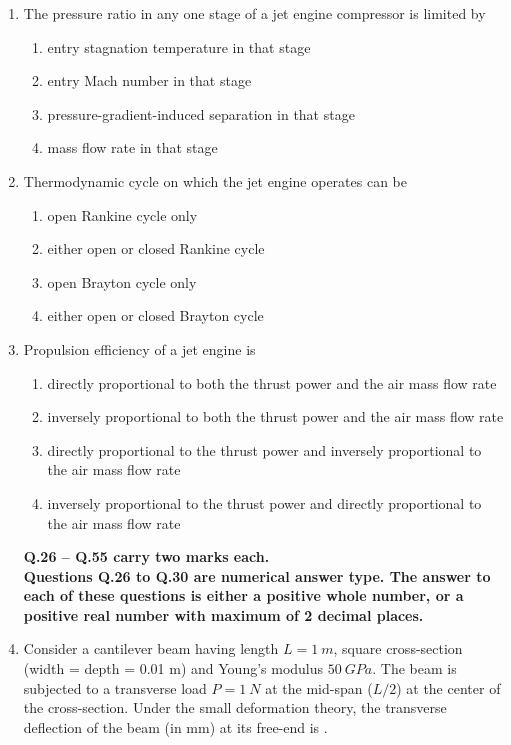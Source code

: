\documentclass{article}
\begin{document}
\begin{enumerate}
\item The pressure ratio in any one stage of a jet engine compressor is limited by
\begin{enumerate}
\item entry stagnation temperature in that stage
\item entry Mach number in that stage
\item pressure-gradient-induced separation in that stage
\item mass flow rate in that stage
\end{enumerate}

\item Thermodynamic cycle on which the jet engine operates can be
\begin{multicols}{2}
\begin{enumerate}
\item open Rankine cycle only
\item either open or closed Rankine cycle
\item open Brayton cycle only
\item either open or closed Brayton cycle
\end{enumerate}
\end{multicols}

\item Propulsion efficiency of a jet engine is
\begin{enumerate}
\item directly proportional to both the thrust power and the air mass flow rate
\item inversely proportional to both the thrust power and the air mass flow rate
\item directly proportional to the thrust power and inversely proportional to the air mass flow rate
\item inversely proportional to the thrust power and directly proportional to the air mass flow rate
\end{enumerate}


\textbf{Q.26 -- Q.55 carry two marks each.}\\
\textbf{Questions Q.26 to Q.30 are numerical answer type. The answer to each of these questions is either a positive whole number, or a positive real number with maximum of 2 decimal places.}


\item Consider a cantilever beam having length $L=1\ m$, square cross-section (width = depth = 0.01 m) and Young’s modulus $50\ GPa$. The beam is subjected to a transverse load $P=1\ N$ at the mid-span ($L/2$) at the center of the cross-section. Under the small deformation theory, the transverse deflection of the beam (in mm) at its free-end is \underline{\hspace{2cm}}.
\begin{figure}[H]
    \centering
    
    \caption{}
    \label{fig:q26}
\end{figure}


\end{enumerate}
\end{document}
